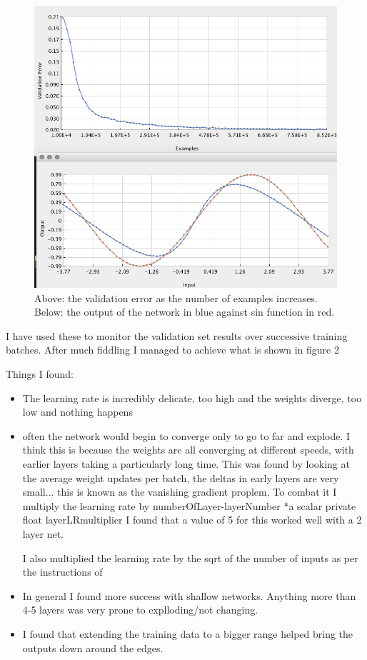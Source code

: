 \documentclass[11pt]{article} %
\begin{document}
\begin{figure}
\centering
\includegraphics*[width=1\linewidth,clip]{figure2}
\caption{Above: the validation error as the number of examples increases. Below: the output of the network in blue against sin function in red. 
\label{valu}  } 
\end{figure}

I have used these to monitor the validation set results over successive training batches. After much fiddling I managed to achieve what is shown in figure 2

Things I found:
\begin{itemize}
\item{The learning rate is incredibly delicate, too high and the weights diverge, too low and nothing happens}
\item{often the network would begin to converge only to go to far and explode. I think this is because the weights are all converging at different speeds, with earlier layers taking a particularly long time. This was found by looking at the average weight updates per batch, the deltas in early layers are very small... this is known as the vanishing gradient proplem. To combat it I multiply the learning rate by numberOfLayer-layerNumber *a scalar     private float layerLRmultiplier
I found that a value of 5 for this worked well with a 2 layer net.

I also multiplied the learning rate by the sqrt of the number of inputs as per the instructions of \cite{LeCun2012}}

\item{In general I found more success with shallow networks. Anything more than 4-5 layers was very prone to explloding/not changing.}
\item{I found that extending the training data to a bigger range helped bring the outputs down around the edges.}
\end{itemize}
\end{document}

